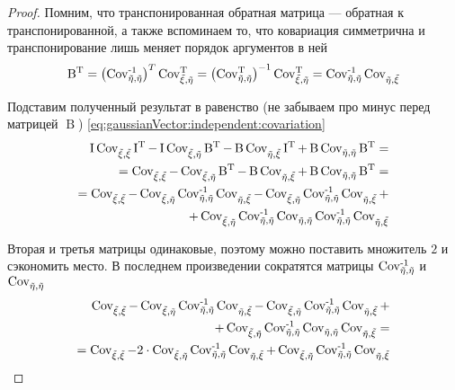 \begin{proof}
    Помним, что транспонированная обратная матрица --- обратная к
    транспонированной, а также вспоминаем то, что ковариация симметрична
    и транспонирование лишь меняет порядок аргументов в ней
    \begin{align*}
        \operatorname{B^T}
            = \left( \dCov[-1]{\vec{\eta}} \right)^T
                \Cov[T]{\vec{\xi}}{\vec{\eta}}
            = \left( \dCov[T]{\vec{\eta}} \right)^{-1}
                \Cov[T]{\vec{\xi}}{\vec{\eta}}
            = \dCov[-1]{\vec{\eta}} \Cov{\vec{\eta}}{\vec{\xi}}
    \end{align*}

    Подставим полученный результат в равенство (не забываем про минус
    перед матрицей $\operatorname{B}$)
    \ref{eq:gaussianVector:independent:covariation}
    \begin{align*}
    \operatorname{I} \dCov{\vec{\xi}} \operatorname{I^T}
        - \operatorname{I} \Cov{\vec{\xi}}{\vec{\eta}} \operatorname{B^T}
        - \operatorname{B} \Cov{\vec{\eta}}{\vec{\xi}} \operatorname{I^T}
        + \operatorname{B} \dCov{\vec{\eta}} \operatorname{B^T} = \\
    = \dCov{\vec{\xi}}
        - \Cov{\vec{\xi}}{\vec{\eta}} \operatorname{B^T}
        - \operatorname{B} \Cov{\vec{\eta}}{\vec{\xi}}
        + \operatorname{B} \dCov{\vec{\eta}} \operatorname{B^T} = \\
    = \dCov{\vec{\xi}}
        - \Cov{\vec{\xi}}{\vec{\eta}}
            \dCov[-1]{\vec{\eta}} \Cov{\vec{\eta}}{\vec{\xi}}
        - \Cov{\vec{\xi}}{\vec{\eta}} \dCov[-1]{\vec{\eta}}
            \Cov{\vec{\eta}}{\vec{\xi}} + \\
        + \Cov{\vec{\xi}}{\vec{\eta}} \dCov[-1]{\vec{\eta}}
            \dCov{\vec{\eta}} \dCov[-1]{\vec{\eta}} \Cov{\vec{\eta}}{\vec{\xi}}
    \end{align*}

    Вторая и третья матрицы одинаковые, поэтому можно поставить множитель $2$ и
    сэкономить место. В последнем произведении сократятся матрицы
    $\dCov[-1]{\vec{\eta}}$ и $\dCov{\vec{\eta}}$
    \begin{align*}
        \dCov{\vec{\xi}}
            - \Cov{\vec{\xi}}{\vec{\eta}}
                \dCov[-1]{\vec{\eta}} \Cov{\vec{\eta}}{\vec{\xi}}
            - \Cov{\vec{\xi}}{\vec{\eta}} \dCov[-1]{\vec{\eta}}
                \Cov{\vec{\eta}}{\vec{\xi}} + \\
            + \Cov{\vec{\xi}}{\vec{\eta}} \dCov[-1]{\vec{\eta}}
                \dCov{\vec{\eta}} \Cov{\vec{\eta}}{\vec{\xi}} = \\
        = \dCov{\vec{\xi}}
            - 2 \cdot \Cov{\vec{\xi}}{\vec{\eta}}
                \dCov[-1]{\vec{\eta}} \Cov{\vec{\eta}}{\vec{\xi}}
            + \Cov{\vec{\xi}}{\vec{\eta}} \dCov[-1]{\vec{\eta}}
                \Cov{\vec{\eta}}{\vec{\xi}}
    \end{align*}


\end{proof}
